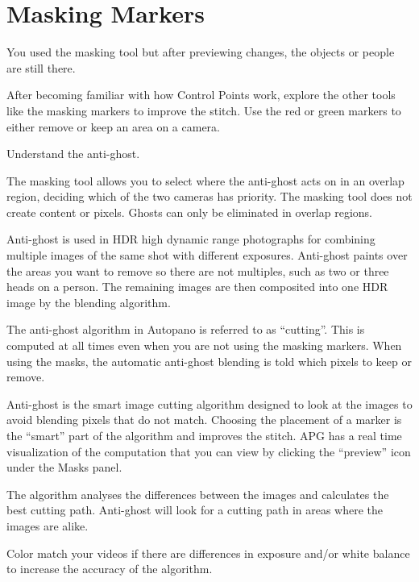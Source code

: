 \chapter{Masking Markers}
\pagecolor{white}
\label{chap:41}
\begin{fullwidth}


\problem

{\large You used the masking tool but after previewing changes, the objects or people are still there. \par}

After becoming familiar with how Control Points work, explore the other tools like the masking markers to improve the stitch. Use the red or green markers to either remove or keep an area on a camera. 


\solutions

{\large Understand the anti-ghost. \par}

The masking tool allows you to select where the anti-ghost acts on in an overlap region, deciding which of the two cameras has priority. The masking tool does not create content or pixels. Ghosts can only be eliminated in overlap regions.


Anti-ghost is used in HDR high dynamic range photographs for combining multiple images of the same shot with different exposures. Anti-ghost paints over the areas you want to remove so there are not multiples, such as two or three heads on a person. The remaining images are then composited into one HDR image by the blending algorithm.

The anti-ghost algorithm in Autopano is referred to as “cutting”. This is computed at all times even when you are not using the masking markers. When using the masks, the automatic anti-ghost blending is told which pixels to keep or remove. 

Anti-ghost is the smart image cutting algorithm designed to look at the images to avoid blending pixels that do not match. Choosing the placement of a marker is the “smart” part of the algorithm and improves the stitch. APG has a real time visualization of the computation that you can view by clicking the “preview” icon under the Masks panel.

The algorithm analyses the differences between the images and calculates the best cutting path. Anti-ghost will look for a cutting path in areas where the images are alike. 

\tip Color match your videos if there are differences in exposure and/or white balance to increase the accuracy of the algorithm.


\end{fullwidth}
